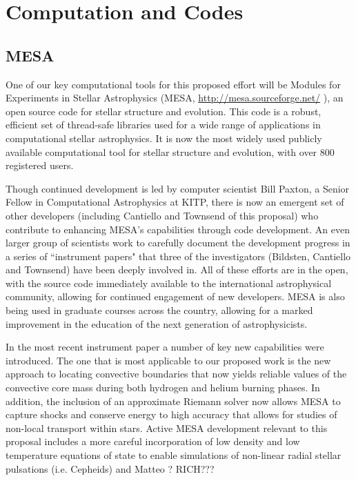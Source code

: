 \section{Computation and Codes}
    
    
{\color{green}    
\subsection{MESA}
}


One of our key computational tools for this proposed effort will be
Modules for Experiments in Stellar Astrophysics (MESA, \href{http://mesa.sourceforge.net/}{http://mesa.sourceforge.net/}
), an open source code for stellar
structure and evolution. This code is a robust, efficient set of
thread-safe libraries used for a wide range of applications in
computational stellar astrophysics. It is now the most widely used
publicly available computational tool for stellar structure and
evolution, with over 800 registered users.

Though continued development is led by computer scientist Bill Paxton,
a Senior Fellow in Computational Astrophysics at KITP, there is now an
emergent set of other developers (including Cantiello and Townsend of
this proposal) who contribute to enhancing MESA's capabilities through
code development. An even larger group of scientists work to carefully
document the development progress in a series of ``instrument papers" \cite{Paxton2010,Paxton2013,Paxton2015,2017arXiv171008424P}
 that three of the investigators
(Bildsten, Cantiello and Townsend) have been deeply involved in.  All
of these efforts are in the open, with the source code immediately
available to the international astrophysical community, allowing for
continued engagement of new developers. MESA is also being used in
graduate courses across the country, allowing for a marked improvement
in the education of the next generation of astrophysicists.

In the most recent instrument paper \citep{2017arXiv171008424P} a number of
key new capabilities were introduced. The one that is most applicable
to our proposed work is the new approach to locating convective
boundaries that now yields reliable values of the convective core mass
during both hydrogen and helium burning phases. In addition, the
inclusion of an approximate Riemann solver now allows MESA to capture
shocks and conserve energy to high accuracy that allows for studies of
non-local transport within stars. Active MESA development relevant to
this proposal includes a more careful incorporation of low density and
low temperature equations of state to enable simulations of
non-linear radial stellar pulsations (i.e. Cepheids) and  Matteo ? RICH???     
    
